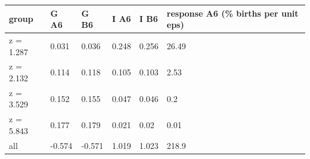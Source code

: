 \begingroup\small
\setlength{\tabcolsep}{3pt}
\renewcommand{\arraystretch}{1.04}
\begin{tabularx}{\linewidth}{XXXXXX}
\toprule
group & G A6 & G B6 & I A6 & I B6 & response A6 (\% births per unit eps) \\
\midrule
z = 1.287 & 0.031 & 0.036 & 0.248 & 0.256 & 26.49 \\
z = 2.132 & 0.114 & 0.118 & 0.105 & 0.103 & 2.53 \\
z = 3.529 & 0.152 & 0.155 & 0.047 & 0.046 & 0.2 \\
z = 5.843 & 0.177 & 0.179 & 0.021 & 0.02 & 0.01 \\
all & -0.574 & -0.571 & 1.019 & 1.023 & 218.9 \\
\bottomrule
\end{tabularx}
\endgroup

